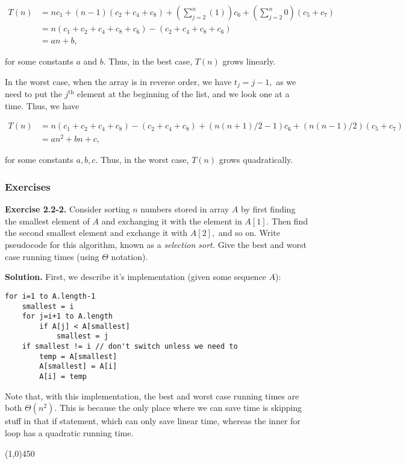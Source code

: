 \documentclass{article}
\newcommand{\exec}[2]
{\textbf{Exercise #1.} #2

\textbf{Solution.}}
\newcommand{\bardiv}{\begin{center}
\line(1,0){450}
\end{center}}
\begin{document}
\begin{align*}
T(n) &= nc_1 + (n-1)(c_2 + c_4 + c_8) + (\sum_{j=2}^{n} (1))c_6 + (\sum_{j=2}^n 0)(c_5 + c_7) \\
     &= n(c_1 + c_2 + c_4 + c_8 + c_6) - (c_2 + c_4 + c_8 + c_6) \\
     &= an + b,
\end{align*}

for some constants $a$ and $b.$ Thus, in the best case, $T(n)$ grows linearly.

In the worst case, when the array is in reverse order, we have $t_j = j-1,$ as we need to put the $j^{\text{th}}$ element at the beginning of the list, and we look one at a time. Thus, we have

\begin{align*}
T(n) &= n(c_1+c_2+c_4+c_8) - (c_2+c_4+c_8) + (n(n+1)/2 - 1)c_6 +(n(n-1)/2)(c_5+c_7) \\
     &= an^2 + bn + c,
\end{align*}

for some constants $a, b, c.$ Thus, in the worst case, $T(n)$ grows quadratically.

\subsubsection{Exercises}

\exec{2.2-2}{Consider sorting $n$ numbers stored in array $A$ by first finding the smallest element of $A$ and exchanging it with the element in $A[1].$ Then find the second smallest element and exchange it with $A[2],$ and so on. Write pseudocode for this algorithm, known as a \textit{selection sort.} Give the best and worst case running times (using $\Theta$ notation).}
First, we describe it's implementation (given some sequence $A$):

\begin{lstlisting}
for i=1 to A.length-1
	smallest = i
	for j=i+1 to A.length
		if A[j] < A[smallest]
			smallest = j
	if smallest != i // don't switch unless we need to
		temp = A[smallest]
		A[smallest] = A[i]
		A[i] = temp
\end{lstlisting}

Note that, with this implementation, the best and worst case running times are both $\Theta(n^2).$ This is because the only place where we can save time is skipping stuff in that if statement, which can only save linear time, whereas the inner for loop has a quadratic running time.

\bardiv
\end{document}
